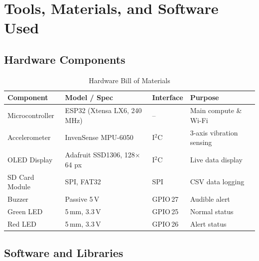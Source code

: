\documentclass[12pt,a4paper]{report}
\begin{document}
\section{Tools, Materials, and Software Used}

\subsection{Hardware Components}

\begin{table}[H]
  \centering
  \caption{Hardware Bill of Materials}
  \label{tab:bom}
  \begin{tabular}{llll}
    \toprule
    \textbf{Component} & \textbf{Model / Spec} & \textbf{Interface} & \textbf{Purpose} \\
    \midrule
    Microcontroller     & ESP32 (Xtensa LX6, 240\,MHz) & --       & Main compute \& Wi-Fi \\
    Accelerometer       & InvenSense MPU-6050           & I$^2$C   & 3-axis vibration sensing \\
    OLED Display        & Adafruit SSD1306, 128$\times$64 px & I$^2$C & Live data display \\
    SD Card Module      & SPI, FAT32                    & SPI      & CSV data logging \\
    Buzzer              & Passive 5\,V                  & GPIO\,27 & Audible alert \\
    Green LED           & 5\,mm, 3.3\,V                 & GPIO\,25 & Normal status \\
    Red LED             & 5\,mm, 3.3\,V                 & GPIO\,26 & Alert status \\
    \bottomrule
  \end{tabular}
\end{table}

\subsection{Software and Libraries}
\end{document}
